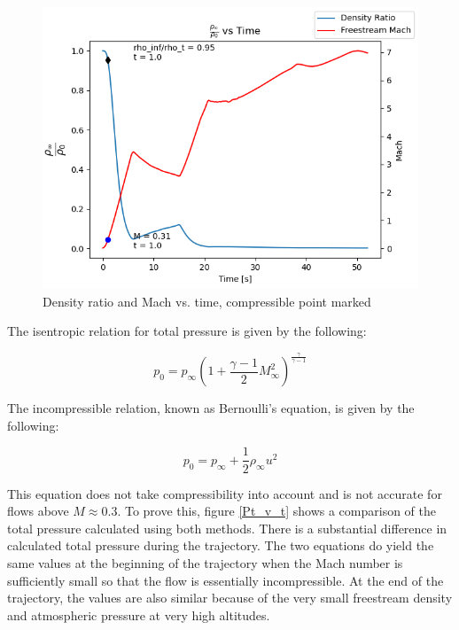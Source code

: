 \documentclass[../main.tex]{subfiles}
\begin{document}
\begin{figure}[h!]
    \centering
    \includegraphics[scale=.7]{../../images/problem_1/rho_rho_t_and_Mach_vs_Time_marked.png}
    \caption{Density ratio and Mach vs. time, compressible point marked}
    \label{rho_rho_t_vs_Mach_marked}
\end{figure}

The isentropic relation for total pressure is given by the following:

\[
    p_0 = p_\infty {\left({1 + \frac{\gamma-1}{2}M_\infty^2}\right)}^{\frac{\gamma}{\gamma-1}}  
\]

The incompressible relation, known as Bernoulli's equation, is given by the following:

\[
    p_0 = p_\infty + \frac{1}{2} \rho_\infty u^2
\]

This equation does not take compressibility into account and is not accurate for flows above \(M \approx 0.3\).
To prove this, figure \ref{Pt_v_t} shows a comparison of the total pressure calculated using both methods. 
There is a substantial difference in calculated total pressure during the trajectory.
The two equations do yield the same values at the beginning of the trajectory when the Mach number is sufficiently small so that the flow is essentially incompressible.
At the end of the trajectory, the values are also similar because of the very small freestream density and atmospheric pressure at very high altitudes.
\end{document}
